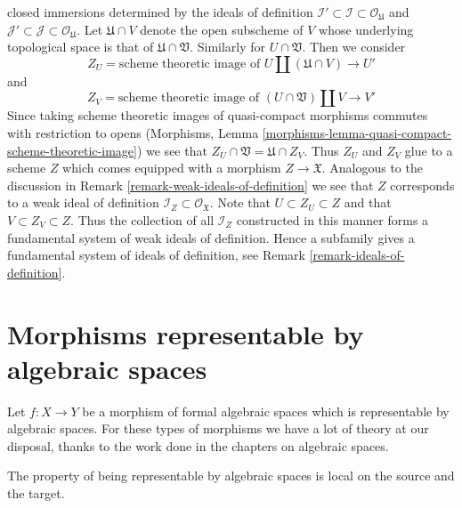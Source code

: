 \begin{remark}
closed immersions determined by the ideals of definition
$\mathcal{I}' \subset \mathcal{I} \subset \mathcal{O}_\mathfrak U$
and
$\mathcal{J}' \subset \mathcal{J} \subset \mathcal{O}_\mathfrak U$.
Let $\mathfrak U \cap V$ denote the open subscheme of $V$ whose
underlying topological space is that of $\mathfrak U \cap \mathfrak V$.
Similarly for $U \cap \mathfrak V$. Then we consider
$$
Z_U = \text{scheme theoretic image of }
U \amalg (\mathfrak U \cap V) \longrightarrow U'
$$
and
$$
Z_V = \text{scheme theoretic image of }
(U \cap \mathfrak V) \amalg V \longrightarrow V'
$$
Since taking scheme theoretic images of quasi-compact morphisms
commutes with restriction to opens (Morphisms, Lemma
\ref{morphisms-lemma-quasi-compact-scheme-theoretic-image})
we see that $Z_U \cap \mathfrak V = \mathfrak U \cap Z_V$.
Thus $Z_U$ and $Z_V$ glue to a scheme $Z$ which comes equipped
with a morphism $Z \to \mathfrak X$. Analogous to the discussion in
Remark \ref{remark-weak-ideals-of-definition}
we see that $Z$ corresponds to a weak ideal
of definition $\mathcal{I}_Z \subset \mathcal{O}_\mathfrak X$.
Note that $U \subset Z_U \subset Z$ and that
$V \subset Z_V \subset Z$. Thus the collection of all $\mathcal{I}_Z$
constructed in this manner forms a fundamental system of weak
ideals of definition. Hence a subfamily gives a fundamental system of ideals
of definition, see Remark \ref{remark-ideals-of-definition}.
\end{remark}






\section{Morphisms representable by algebraic spaces}
\label{section-representable}

\noindent
Let $f : X \to Y$ be a morphism of formal algebraic spaces which
is representable by algebraic spaces. For these types of morphisms
we have a lot of theory at our disposal, thanks to the work done
in the chapters on algebraic spaces.

\medskip\noindent
The property of being representable by algebraic spaces is local on the
source and the target.

